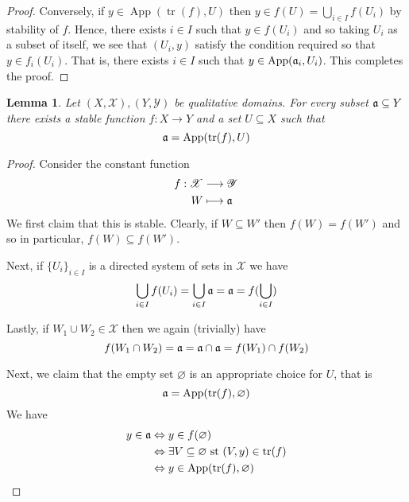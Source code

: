 \documentclass[12pt]{article}
\theoremstyle{plain}
\newtheorem{lemma}[thm]{Lemma}
\theoremstyle{definition}
\newcommand{\scr}[1]{\mathscr{#1}}
\newcommand{\lto}{\longrightarrow}
\begin{document}
\begin{proof}
		Conversely, if $y \in \operatorname{App}(\operatorname{tr}(f), U)$ then $y \in f(U) = \bigcup_{i \in I}f(U_i)$ by stability of $f$. Hence, there exists $i \in I$ such that $y \in f(U_i)$ and so taking $U_i$ as a subset of itself, we see that $(U_i, y)$ satisfy the condition required so that $y \in f_i(U_i)$. That is, there exists $i \in I$ such that $y \in \operatorname{App}(\frak{a}_i, U_i)$. This completes the proof.
		\end{proof}
	
	\begin{lemma}\label{lem:app_binary}
		Let $(X, \scr{X}), (Y, \scr{Y})$ be qualitative domains. For every subset $\frak{a} \subseteq Y$ there exists a stable function $f: X \lto Y$ and a set $U \subseteq X$ such that
		\begin{equation}
			\frak{a} = \operatorname{App}(\operatorname{tr}(f), U)
			\end{equation}
		\end{lemma}
	\begin{proof}
		Consider the constant function
		\begin{align*}
			f: \scr{X} &\lto \scr{Y}\\
			W &\longmapsto \frak{a}
			\end{align*}
		We first claim that this is stable. Clearly, if $W \subseteq W'$ then $f(W) = f(W')$ and so in particular, $f(W) \subseteq f(W')$.
		
		Next, if $\{ U_i \}_{i \in I}$ is a directed system of sets in $\scr{X}$ we have
		\begin{equation}
			\bigcup_{i \in I}f(U_i) = \bigcup_{i \in I}\frak{a} = \frak{a}  = f(\bigcup_{i \in I})
			\end{equation}
		
		Lastly, if $W_1 \cup W_2 \in \scr{X}$ then we again (trivially) have
		\begin{equation}
			f(W_1 \cap W_2) = \frak{a} = \frak{a}\cap \frak{a} = f(W_1) \cap f(W_2)
			\end{equation}
		
		Next, we claim that the empty set $\varnothing$ is an appropriate choice for $U$, that is
		\begin{equation}
			\frak{a} = \operatorname{App}(\operatorname{tr}(f), \varnothing)
			\end{equation}
		We have
		\begin{align*}
			y \in \frak{a} &\Leftrightarrow y \in f(\varnothing)\\
			&\Leftrightarrow \exists V \subseteq \varnothing\text{ st }(V,y) \in \operatorname{tr}(f)\\
			&\Leftrightarrow y \in \operatorname{App}(\operatorname{tr}(f), \varnothing)
			\end{align*}
		\end{proof}
	
\end{document}
